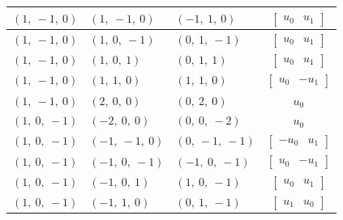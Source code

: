 \documentclass[11pt]{article}
\theoremstyle{definition}
\begin{document}
\begin{longtable}{|l|l|l|c|}
    \hline
    $\left( 1, \  -1, \  0\right)$ & $\left( 1, \  -1, \  0\right)$ & $\left( -1, \  1, \  0\right)$ & $\left[\begin{matrix}u_{0} & u_{1}\end{matrix}\right]$ \\
    \hline
    $\left( 1, \  -1, \  0\right)$ & $\left( 1, \  0, \  -1\right)$ & $\left( 0, \  1, \  -1\right)$ & $\left[\begin{matrix}u_{0} & u_{1}\end{matrix}\right]$ \\
    \hline
    $\left( 1, \  -1, \  0\right)$ & $\left( 1, \  0, \  1\right)$ & $\left( 0, \  1, \  1\right)$ & $\left[\begin{matrix}u_{0} & u_{1}\end{matrix}\right]$ \\
    \hline
    $\left( 1, \  -1, \  0\right)$ & $\left( 1, \  1, \  0\right)$ & $\left( 1, \  1, \  0\right)$ & $\left[\begin{matrix}u_{0} & - u_{1}\end{matrix}\right]$ \\
    \hline
    $\left( 1, \  -1, \  0\right)$ & $\left( 2, \  0, \  0\right)$ & $\left( 0, \  2, \  0\right)$ & $u_{0}$ \\
    \hline
    $\left( 1, \  0, \  -1\right)$ & $\left( -2, \  0, \  0\right)$ & $\left( 0, \  0, \  -2\right)$ & $u_{0}$ \\
    \hline
    $\left( 1, \  0, \  -1\right)$ & $\left( -1, \  -1, \  0\right)$ & $\left( 0, \  -1, \  -1\right)$ & $\left[\begin{matrix}- u_{0} & u_{1}\end{matrix}\right]$ \\
    \hline
    $\left( 1, \  0, \  -1\right)$ & $\left( -1, \  0, \  -1\right)$ & $\left( -1, \  0, \  -1\right)$ & $\left[\begin{matrix}u_{0} & - u_{1}\end{matrix}\right]$ \\
    \hline
    $\left( 1, \  0, \  -1\right)$ & $\left( -1, \  0, \  1\right)$ & $\left( 1, \  0, \  -1\right)$ & $\left[\begin{matrix}u_{0} & u_{1}\end{matrix}\right]$ \\
    \hline
    $\left( 1, \  0, \  -1\right)$ & $\left( -1, \  1, \  0\right)$ & $\left( 0, \  1, \  -1\right)$ & $\left[\begin{matrix}u_{1} & u_{0}\end{matrix}\right]$ \\

\end{longtable}
\end{document}
